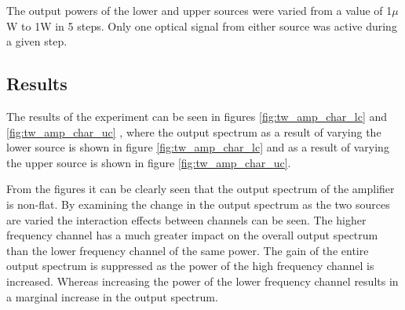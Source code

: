 The output powers of the lower and upper sources were varied from a value of 1$\mu$W to 1W in 5 steps. Only one optical signal from either source was active during a given step.

\subsection{Results}


The results of the experiment can be seen in figures \ref{fig:tw_amp_char_lc} and \ref{fig:tw_amp_char_uc} , where the output spectrum as a result of varying the lower source is shown in figure \ref{fig:tw_amp_char_lc} and as a result of varying the upper source is shown in figure \ref{fig:tw_amp_char_uc}. 

From the figures it can be clearly seen that the output spectrum of the amplifier is non-flat. By examining the change in the output spectrum as the two sources are varied the interaction effects between channels can be seen. The higher frequency channel has a much greater impact on the overall output spectrum than the lower frequency channel of the same power. The gain of the entire output spectrum is suppressed as the power of the high frequency channel is increased. Whereas increasing the power of the lower frequency channel results in a marginal increase in the output spectrum. 



